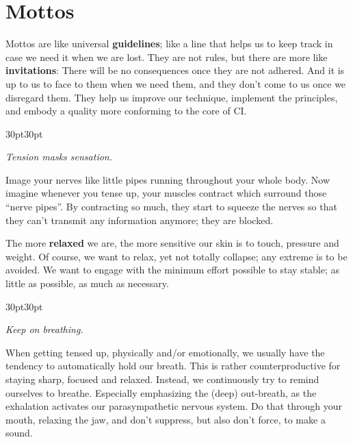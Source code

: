 \chapter{Mottos}\label{ch:mottos}


Mottos are like universal \textbf{guidelines}; like a line that helps us to keep track in case we need it when we are lost.
They are not rules, but there are more like \textbf{invitations}: There will be no consequences once they are not adhered.
And it is up to us to face to them when we need them, and they don't come to us once we disregard them.
They help us improve our technique, implement the principles, and embody a quality more conforming to the core of CI\@.


\newcommand{\motto}[1]{
    \vspace{5pt}
    \begin{adjustwidth}{30pt}{30pt}
        \begin{center}
            \textit{#1}
        \end{center}
    \end{adjustwidth}
}

\motto{Tension masks sensation.}

Image your nerves like little pipes running throughout your whole body.
Now imagine whenever you tense up, your muscles contract which surround those ``nerve pipes''.
By contracting so much, they start to squeeze the nerves so that they can't transmit any information anymore; they are blocked.

The more \textbf{relaxed} we are, the more sensitive our skin is to touch, pressure and weight.
Of course, we want to relax, yet not totally collapse; any extreme is to be avoided.
We want to engage with the minimum effort possible to stay stable; as little as possible, as much as necessary.

\motto{Keep on breathing.}
When getting tensed up, physically and/or emotionally, we usually have the tendency to automatically hold our breath.
This is rather counterproductive for staying sharp, focused and relaxed.
Instead, we continuously try to remind ourselves to breathe.
Especially emphasizing the (deep) out-breath, as the exhalation activates our parasympathetic nervous system.
Do that through your mouth, relaxing the jaw, and don't suppress, but also don't force, to make a sound.

